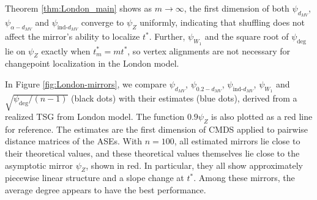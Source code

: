 \documentclass[12pt]{article}
\newcommand{\EE}{\mathbb{E}}
\theoremstyle{definition}
\begin{document}
Theorem \ref{thm:London_main} shows as $m \to \infty$, the first dimension of both $\psi_{d_{MV}}$, $\psi_{\alpha-d_{MV}}$ and $\psi_{\text{ind-}d_{MV}}$ converge to $\psi_Z$ uniformly, indicating that shuffling does not affect the mirror's ability to localize $t^*$. 
Further, $\psi_{W_1}$ and the square root of $\psi_{\text{deg}}$ lie on $\psi_Z$ exactly when $t_m^* = mt^*$, so vertex alignments are not necessary for changepoint localization in the London model.

In Figure \ref{fig:London-mirrors}, we compare $\psi_{d_{MV}}$,  $\psi_{0.2-d_{MV}}$, $\psi_{\text{ind-}d_{MV}}$, $\psi_{W_1}$ and $\sqrt{\psi_{\text{deg}}/(n-1)}$ (black dots) with their estimates (blue dots), derived from a realized TSG from London model.
The function $0.9\psi_Z$ is also plotted as a red line for reference.
The estimates are the first dimension of CMDS applied to pairwise distance matrices of the ASEs.
With $n=100$, all estimated mirrors lie close to their theoretical values, and these theoretical values themselves lie close to the asymptotic mirror $\psi_Z$, shown in red. In particular, they all show approximately piecewise linear structure and a slope change at $t^*$. Among these mirrors, the average degree appears to have the best performance.
\end{document}
